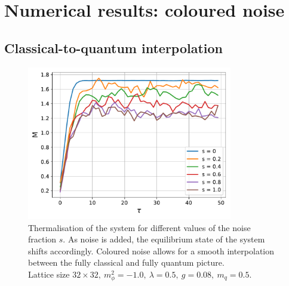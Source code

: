 \chapter{Numerical results: coloured noise}
\label{chapt:results_coloured}

\section{Classical-to-quantum interpolation}

\label{sec:classical_to_quantum}

\begin{figure}[h]
    \centering
    \includegraphics[width=0.8\textwidth]{figures/slide_broken/thermalisation.pdf}
    \caption[Thermalisation of the system for different values of the noise fraction $s$.]{Thermalisation of the system for different values of the noise fraction $s$. As noise is added, the equilibrium state of the system shifts accordingly. Coloured noise allows for a smooth interpolation between the fully classical and fully quantum picture.\\ Lattice size $32 \times 32, \ m_\phi^2=-1.0, \ \lambda=0.5, \ g=0.08, \ m_q = 0.5$.}
    \label{fig:thermalisation_different_noise_fracs}
\end{figure}

